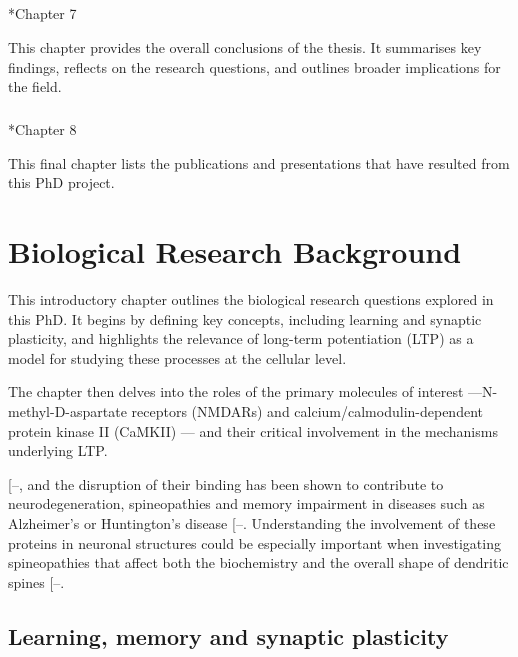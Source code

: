 \documentclass[
  11pt,
  letterpaper,
]{scrreprt}
\makeatletter
\let\oldparagraph\paragraph
\renewcommand{\paragraph}{
    \@ifstar
      \xxxParagraphStar
      \xxxParagraphNoStar
  }
\newcommand{\xxxParagraphStar}[1]{\oldparagraph*{#1}\mbox{}}
\newcommand{\xxxParagraphNoStar}[1]{\oldparagraph{#1}\mbox{}}
\makeatother
\begin{document}
\paragraph*{Chapter 7}\label{chapter-7}

This chapter provides the overall conclusions of the thesis. It
summarises key findings, reflects on the research questions, and
outlines broader implications for the field.

\paragraph*{Chapter 8}\label{chapter-8}

This final chapter lists the publications and presentations that have
resulted from this PhD project.


\chapter{Biological Research Background}\label{sec-biology-chapter}

This introductory chapter outlines the biological research questions
explored in this PhD. It begins by defining key concepts, including
learning and synaptic plasticity, and highlights the relevance of
long-term potentiation (LTP) as a model for studying these processes at
the cellular level.

The chapter then delves into the roles of the primary molecules of
interest ---N-methyl-D-aspartate receptors (NMDARs) and
calcium/calmodulin-dependent protein kinase II (CaMKII) --- and their
critical involvement in the mechanisms underlying LTP.


{[}--\citeproc{ref-bayer2024Revised}{11}{]},
and the disruption of their binding has been shown to contribute to
neurodegeneration, spineopathies and memory impairment in diseases such
as Alzheimer's or Huntington's disease
{[}--\citeproc{ref-yang2023NMDA}{8}{]}.
Understanding the involvement of these proteins in neuronal structures
could be especially important when investigating spineopathies that
affect both the biochemistry and the overall shape of dendritic spines
{[}--\citeproc{ref-yasuda2017Biophysics}{15}{]}.

\section{Learning, memory and synaptic
plasticity}\label{sec-learning-memory-plasticity}
\end{document}
